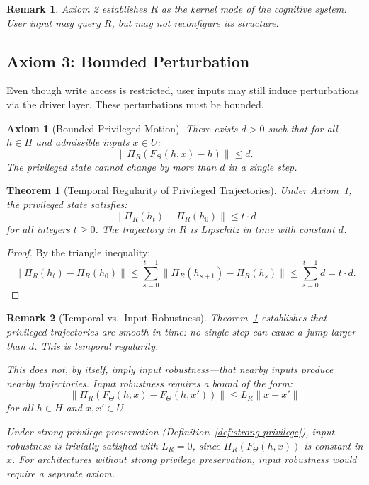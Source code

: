 \documentclass[11pt,a4paper]{article}
\newtheorem{theorem}{Theorem}[section]
\newtheorem{axiom}{Axiom}
\newtheorem*{remark}{Remark}
\begin{document}
\begin{remark}
Axiom 2 establishes $R$ as the kernel mode of the cognitive system. User input may query $R$, but may not reconfigure its structure.
\end{remark}

\subsection{Axiom 3: Bounded Perturbation}

Even though write access is restricted, user inputs may still induce perturbations via the driver layer. These perturbations must be bounded.

\begin{axiom}[Bounded Privileged Motion]
\label{ax:bounded-motion}
There exists $d > 0$ such that for all $h \in H$ and admissible inputs $x \in U$:
\begin{equation}
\|\Pi_R(F_\Theta(h, x) - h)\| \leq d.
\end{equation}
The privileged state cannot change by more than $d$ in a single step.
\end{axiom}

\begin{theorem}[Temporal Regularity of Privileged Trajectories]
\label{thm:temporal-regularity}
Under Axiom~\ref{ax:bounded-motion}, the privileged state satisfies:
\[
\|\Pi_R(h_t) - \Pi_R(h_0)\| \leq t \cdot d
\]
for all integers $t \geq 0$. The trajectory in $R$ is Lipschitz in time with constant $d$.
\end{theorem}

\begin{proof}
By the triangle inequality:
\[
\|\Pi_R(h_t) - \Pi_R(h_0)\| \leq \sum_{s=0}^{t-1} \|\Pi_R(h_{s+1}) - \Pi_R(h_s)\| \leq \sum_{s=0}^{t-1} d = t \cdot d.
\]
\end{proof}

\begin{remark}[Temporal vs.\ Input Robustness]
\label{rem:temporal-vs-input}
Theorem~\ref{thm:temporal-regularity} establishes that privileged trajectories are smooth in time: no single step can cause a jump larger than $d$. This is \emph{temporal regularity}.

This does not, by itself, imply \emph{input robustness}---that nearby inputs produce nearby trajectories. Input robustness requires a bound of the form:
\[
\|\Pi_R(F_\Theta(h, x) - F_\Theta(h, x'))\| \leq L_R \|x - x'\|
\]
for all $h \in H$ and $x, x' \in U$.

Under strong privilege preservation (Definition~\ref{def:strong-privilege}), input robustness is trivially satisfied with $L_R = 0$, since $\Pi_R(F_\Theta(h, x))$ is constant in $x$. For architectures without strong privilege preservation, input robustness would require a separate axiom.
\end{remark}
\end{document}
